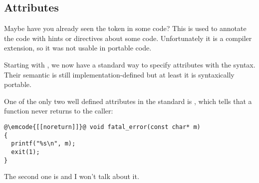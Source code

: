 \subsection{Attributes}

Maybe have you already seen the  token in
some \cpp{} code? This is used to annotate the code with hints or
directives about some code. Unfortunately it is a compiler extension,
so it was not usable in portable code.

Starting with , we now have a standard way to specify attributes
with the  syntax. Their semantic is still
implementation-defined but at least it is syntaxically portable.

One of the only two well defined attributes in the 
standard is \code{[[noreturn]]}, which tells that a function never
returns to the caller:

\begin{lstlisting}
@\emcode{[[noreturn]]}@ void fatal_error(const char* m)
{
  printf("%s\n", m);
  exit(1);
}
\end{lstlisting}

The second one is  and I won't talk
about it.
